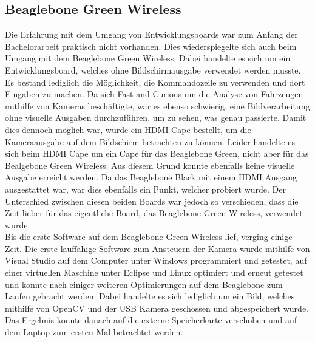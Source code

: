 \subsection{Beaglebone Green Wireless}
Die Erfahrung mit dem Umgang von Entwicklungsboards war zum Anfang der Bachelorarbeit praktisch nicht vorhanden. Dies wiederspiegelte sich auch beim Umgang mit dem Beaglebone Green Wireless. Dabei handelte es sich um ein Entwicklungsboard, welches ohne Bildschirmausgabe verwendet werden musste. Es bestand lediglich die Möglichkeit, die Kommandozeile zu verwenden und dort Eingaben zu machen. Da sich Fast and Curious um die Analyse von Fahrzeugen mithilfe von Kameras beschäftigte, war es ebenso schwierig, eine Bildverarbeitung ohne visuelle Ausgaben durchzuführen, um zu sehen, was genau passierte. Damit dies dennoch möglich war, wurde ein HDMI Cape bestellt, um die Kameraausgabe auf dem Bildschirm betrachten zu können. Leider handelte es sich beim HDMI Cape um ein Cape für das Beaglebone Green, nicht aber für das Bealgebone Green Wireless. Aus diesem Grund konnte ebenfalls keine visuelle Ausgabe erreicht werden. Da das Beaglebone Black mit einem HDMI Ausgang ausgestattet war, war dies ebenfalls ein Punkt, welcher probiert wurde. Der Unterschied zwischen diesen beiden Boards war jedoch so verschieden, dass die Zeit lieber für das eigentliche Board, das Beaglebone Green Wireless, verwendet wurde.\\ 
Bis die erste Software auf dem Beaglebone Green Wireless lief, verging einige Zeit. Die erste lauffähige Software zum Ansteuern der Kamera wurde mithilfe von Visual Studio auf dem Computer unter Windows programmiert und getestet, auf einer virtuellen Maschine unter Eclipse und Linux optimiert und erneut getestet und konnte nach einiger weiteren Optimierungen auf dem Beaglebone zum Laufen gebracht werden. Dabei handelte es sich lediglich um ein Bild, welches mithilfe von OpenCV und der USB Kamera geschossen und abgespeichert wurde. Das Ergebnis konnte danach auf die externe Speicherkarte verschoben und auf dem Laptop zum ersten Mal betrachtet werden.